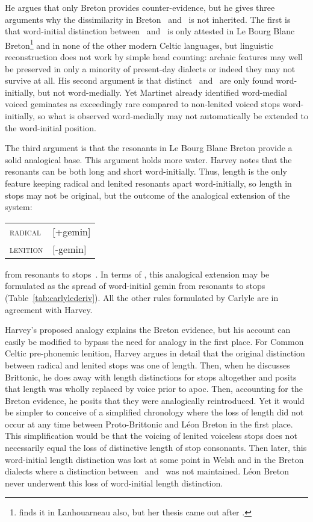 He argues that only Breton provides counter-evidence, but he gives three arguments why the dissimilarity in Breton \lT\ and \xD\ is not inherited. The first is that word-initial distinction between \lT\ and \xD\ is only attested in Le Bourg Blanc Breton\footnote{\Textcite{carlyle_syllabic_1988} finds it in Lanhouarneau also, but her thesis came out after \textcite{harvey_aspects_1984}.} and in none of the other modern Celtic languages, but linguistic reconstruction does not work by simple head counting: archaic features may well be preserved in only a minority of present-day dialects or indeed they may not survive at all. His second argument is that distinct \lT\ and \xD\ are only found word-initially, but not word-medially. Yet Martinet already identified word-medial voiced geminates as exceedingly rare compared to non-lenited voiced stops word-initially, so what is observed word-medially may not automatically be extended to the word-initial position.

The third argument is that the resonants in Le Bourg Blanc Breton provide a solid analogical base. This argument holds more water. Harvey notes that the resonants  can be both long and short word-initially. Thus, length is the only feature keeping radical and lenited resonants apart word-initially, so length in stops may not be original, but the outcome of the analogical extension of the system:
\begin{center}
  \begin{tabular}{l@{~=~}l}
    \textsc{radical}  & [+\gls{gemin}]\\
    \textsc{lenition} & [-\gls{gemin}]
  \end{tabular}
\end{center}
from resonants to stops~\autocite{harvey_aspects_1984}. In terms of  \textcite{carlyle_syllabic_1988}, this analogical extension may be formulated as the spread of word-initial \gls{gemin} from resonants to stops (Table~\ref{tab:carlylederiv}). All the other rules formulated by Carlyle are in agreement with Harvey.

Harvey's proposed analogy explains the Breton evidence, but his account can easily be modified to bypass the need for  analogy in the first place. For Common Celtic pre-phonemic lenition, Harvey argues in detail that the original distinction between radical and lenited stops was one of length. Then, when he discusses Brittonic, he does away with length distinctions for stops altogether and posits that length was wholly replaced by voice prior to \gls{apoc}. Then, accounting for the Breton evidence, he posits that they were analogically reintroduced. Yet it would be simpler to conceive of a simplified chronology where the loss of length did not occur at any time between Proto-Brittonic and Léon Breton in the first place. This simplification would be that the voicing of lenited voiceless stops does not necessarily equal the loss of distinctive length of stop consonants. Then later, this word-initial length distinction was lost at some point in Welsh and in the Breton dialects where a distinction between \lT\ and \xD\ was not maintained. Léon Breton never underwent this loss of word-initial length distinction.

